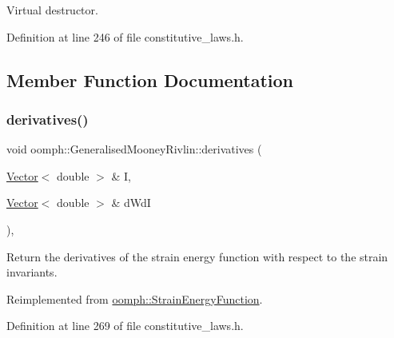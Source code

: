 Virtual destructor. 



Definition at line 246 of file constitutive\+\_\+laws.\+h.



\subsection{Member Function Documentation}
\mbox{\label{classoomph_1_1GeneralisedMooneyRivlin_aa0ca6d085deb4758119ff68222a27a8b}} 
\subsubsection{\texorpdfstring{derivatives()}{derivatives()}}
{\footnotesize\ttfamily void oomph\+::\+Generalised\+Mooney\+Rivlin\+::derivatives (\begin{DoxyParamCaption}\item[{\hyperlink{classoomph_1_1Vector}{Vector}$<$ double $>$ \&}]{I,  }\item[{\hyperlink{classoomph_1_1Vector}{Vector}$<$ double $>$ \&}]{d\+WdI }\end{DoxyParamCaption})\hspace{0.3cm}{\ttfamily [inline]}, {\ttfamily [virtual]}}



Return the derivatives of the strain energy function with respect to the strain invariants. 



Reimplemented from \hyperlink{classoomph_1_1StrainEnergyFunction_a81ca7bb14cce217ffac9d308dba39756}{oomph\+::\+Strain\+Energy\+Function}.



Definition at line 269 of file constitutive\+\_\+laws.\+h.

\mbox{\label{classoomph_1_1GeneralisedMooneyRivlin_a2b41a132a90707ee2901787d398f45f8}} 
